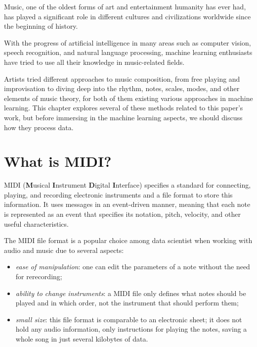 Music, one of the oldest forms of art and entertainment humanity has ever had,
has played a significant role in different cultures and civilizations worldwide
since the beginning of history.

With the progress of artificial intelligence in many areas such as computer vision,
speech recognition, and natural language processing,
machine learning enthusiasts have tried
to use all their knowledge in music-related fields. \cite{musicCompositionML}

Artists tried different approaches to music composition,
from free playing and improvisation to diving deep into the
rhythm, notes, scales, modes, and other elements of music theory,
for both of them existing various approaches in machine learning.
This chapter explores several of these methods related to this paper's work,
but before immersing in the machine learning aspects, we should discuss how they process data.



\section{What is MIDI?}
MIDI (\textbf{M}usical \textbf{I}nstrument \textbf{D}igital \textbf{I}nterface) specifies a standard for connecting,
playing, and recording electronic instruments and a file format to store this information.
It uses messages in an event-driven manner,
meaning that each note is represented as an event that specifies its
notation, pitch, velocity, and other useful characteristics. \cite{midiCourse}

The MIDI file format is a popular choice among data scientist
when working with audio and music due to several aspects:

\begin{itemize}
    \item{
          \emph{ease of manipulation}:
          one can edit the parameters of a note without the need for rerecording; \cite{midiAmanda}
          }
    \item{
          \emph{ability to change instruments}:
          a MIDI file only defines what notes should be played and in which order,
          not the instrument that should perform them; \cite{midiAmanda}
          }
    \item{
          \emph{small size}: this file format is comparable to an electronic sheet;
          it does not hold any audio information,
          only instructions for playing the notes,
          saving a whole song in just several kilobytes of data. \cite{midiAmanda}
          }
\end{itemize}

